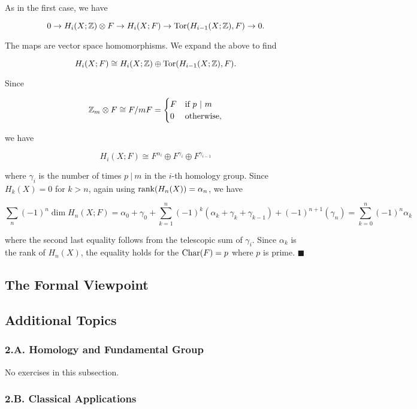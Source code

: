 \documentclass{article}
\newcommand{\Z}{\mathbb{Z}}
\newcommand{\Tor}{\textnormal{Tor}}
\newcommand{\Char}{\textnormal{Char}}
\begin{document}
As in the first case, we have

$$0\to H_{i}(X; \Z)\otimes F\to H_{i}(X; F)\to \Tor(H_{i-1}(X; \Z), F)\to 0.$$

The maps are vector space homomorphisms. We expand the above to find

$$H_{i}(X; F)\cong H_{i}(X; \Z)\oplus \Tor(H_{i-1}(X; \Z), F).$$

Since

\[\Z_{m}\otimes F\cong F/mF = \begin{cases} F & \textnormal{if } p\ |\ m\\ 0 & \textnormal{otherwise}, \end{cases}\]

we have

$$H_{i}(X; F)\cong F^{\alpha_{i}}\oplus F^{\gamma_{i}}\oplus F^{\gamma_{i-1}}$$

where $\gamma_{i}$ is the number of times $p\ |\ m$ in the $i$-th homology group. Since $H_{k}(X) = 0$ for $k > n$, again using $\textnormal{rank}(H_{n}(X)) = \alpha_{n}$, we have

$$\sum_{n}(-1)^{n}\dim H_{n}(X; F) = \alpha_{0} + \gamma_{0} + \sum_{k=1}^{n} (-1)^{k}(\alpha_{k} + \gamma_{k} + \gamma_{k-1}) + (-1)^{n+1}(\gamma_{n}) = \sum_{k=0}^{n} (-1)^{n}\alpha_{k}$$

where the second last equality follows from the telescopic sum of $\gamma_{i}$. Since $\alpha_{k}$ is the rank of $H_{n}(X)$, the equality holds for the $\Char (F) = p$ where $p$ is prime. $\blacksquare$
\bigskip
\bigskip

\subsection{The Formal Viewpoint}

\subsection*{Additional Topics}

\subsubsection*{2.A. Homology and Fundamental Group}

\tab No exercises in this subsection.
\bigskip
\bigskip

\subsubsection*{2.B. Classical Applications}
\end{document}
